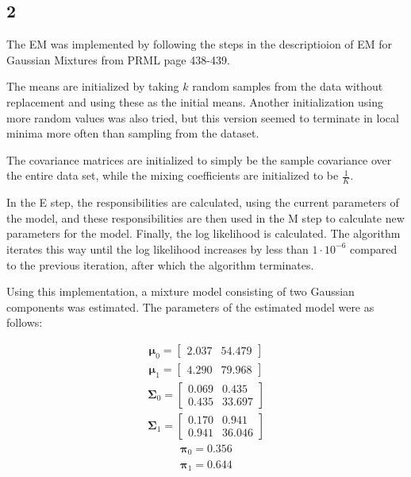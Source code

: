 \documentclass[a4paper, 12pt]{article}
\begin{document}
\subsection{2}

The EM was implemented by following the steps in the descriptioion of EM for Gaussian Mixtures from PRML page 438-439.

The means are initialized by taking $k$ random samples from the data without replacement and using these as the initial means. Another initialization using more random values was also tried, but this version seemed to terminate in local minima more often than sampling from the dataset.



The covariance matrices are initialized to simply be the sample covariance over the entire data set, while the mixing coefficients are initialized to be $\frac{1}{K}$.

In the E step, the responsibilities are calculated, using the current parameters of the model, and these responsibilities are then used in the M step to calculate new parameters for the model. Finally, the log likelihood is calculated. The algorithm iterates this way until the log likelihood increases by less than $1 \cdot 10^{-6}$ compared to the previous iteration, after which the algorithm terminates.

Using this implementation, a mixture model consisting of two Gaussian components was estimated. The parameters of the estimated model were as follows:

\begin{align}
	\mathbf{\mu}_0 = \left[\begin{array}{cc}
		2.037 & 54.479
	\end{array}\right]\\
	\mathbf{\mu}_1 = \left[\begin{array}{cc}
		4.290 & 79.968
	\end{array}\right]
\end{align}
\begin{align}
	\mathbf{\Sigma}_0 = \left[\begin{array}{cc}
		0.069 & 0.435\\
		0.435 & 33.697
	\end{array}\right]\\
	\mathbf{\Sigma}_1 = \left[\begin{array}{cc}
		0.170 & 0.941\\
		0.941 & 36.046
	\end{array}\right]
\end{align}
\begin{align}
	\mathbf{\pi}_0 = 0.356\\
	\mathbf{\pi}_1 = 0.644
\end{align}
\end{document}
